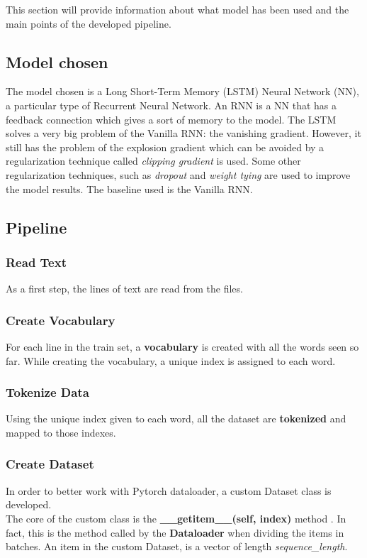 This section will provide information about what model has been used and the main points of the developed pipeline.

\subsection{Model chosen}
The model chosen is a Long Short-Term Memory (LSTM) Neural Network (NN), a particular type of Recurrent Neural Network. An RNN is a NN that has a feedback connection which gives a sort of memory to the model. The LSTM solves a very big problem of the Vanilla RNN: the vanishing gradient. However, it still has the problem of the explosion gradient which can be avoided by a regularization technique called \textit{clipping gradient} is used. Some other regularization techniques, such as \textit{dropout} and \textit{weight tying} are used to improve the model results. The baseline used is the Vanilla RNN.

\subsection{Pipeline} \label{pipeline}

\subsubsection{Read Text}
As a first step, the lines of text are read from the files.
\subsubsection{Create Vocabulary}
For each line in the train set, a \textbf{vocabulary} is created with all the words seen so far. While creating the vocabulary, a unique index is assigned to each word.

\subsubsection{Tokenize Data}
Using the unique index given to each word, all the dataset are \textbf{tokenized} and mapped to those indexes.
\subsubsection{Create Dataset}
In order to better work with Pytorch dataloader, a custom Dataset class is developed. \\
The core of the custom class is the \textbf{\_\_getitem\_\_(self, index)} method \cite{customDatasets}. In fact, this is the method called by the \textbf{Dataloader} when dividing the items in batches. An item in the custom Dataset, is a vector of length \textit{sequence\_length}. 
